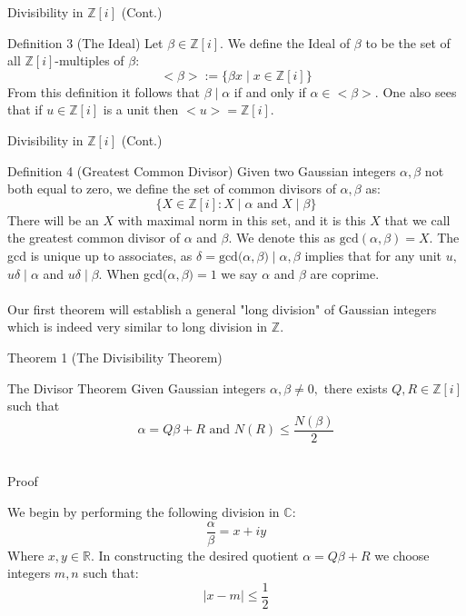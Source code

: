 \begin{frame}{Divisibility in $\mathbb{Z}[i]$ (Cont.)}
    \begin{block}{Definition 3 (The Ideal)}
        Let $\beta \in \mathbb{Z}[i].$ We define the Ideal of $\beta$ to be the set of all $\mathbb{Z}[i]$-multiples of $\beta:$\\
$$<\beta>:=\{\beta x\mid x\in\mathbb{Z}[i]\}$$
From this definition it follows that $\beta \mid \alpha$ if and only if $\alpha \in <\beta>.$ One also sees that if $u\in\mathbb{Z}[i]$ is a unit then $<u>=\mathbb{Z}[i].$
    \end{block}
\end{frame}




\begin{frame}{Divisibility in $\mathbb{Z}[i]$ (Cont.)}
    \begin{block}{Definition 4 (Greatest Common Divisor)}
        Given two Gaussian integers $\alpha, \beta$ not both equal to zero, we define the set of common divisors of $\alpha, \beta$ as:
$$\{X\in\mathbb{Z}[i]: X\mid \alpha \text{ and } X\mid\beta\}$$
There will be an $X$ with maximal norm in this set, and it is this $X$ that we call the greatest common divisor of $\alpha$ and $\beta.$ We denote this as $\text{gcd}(\alpha, \beta)=X.$ The gcd is unique up to associates, as $\delta=\text{gcd(}\alpha,\beta)\mid \alpha,\beta$ implies that for any unit $u,$ $u\delta\mid\alpha$ and $u\delta\mid \beta$. When gcd($\alpha,\beta)=1$ we say $\alpha$ and $\beta$ are coprime. \\\\

Our first theorem will establish a general "long division" of Gaussian integers which is indeed very similar to long division in $\mathbb{Z}.$
    \end{block}
\end{frame}




\begin{frame}{Theorem 1 (The Divisibility Theorem)}
    \begin{block}{The Divisor Theorem}
        Given Gaussian integers $\alpha,
\beta\neq 0,$ there exists $Q,R\in\mathbb{Z}[i]$ such that 
$$\alpha=Q\beta + R \text{  and  } N(R)\leq \frac{N(\beta)}{2}$$\\
    \end{block}
    \begin{block}{Proof}
        \begin{proofs}
            We begin by performing the following division in $\mathbb{C}:$
$$\frac{\alpha}{\beta} =x+iy$$
Where $x,y\in\mathbb{R}.$ In constructing the desired quotient $\alpha=Q\beta +R$ we choose integers $m,n$ such that:
$$\mid x-m\mid \leq \frac{1}{2}$$
        \end{proofs}
    \end{block}
\end{frame}




